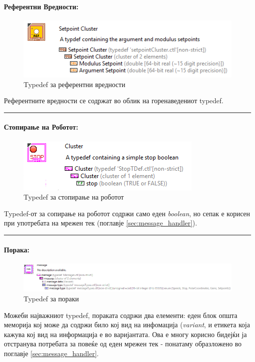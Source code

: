 \documentclass[11pt]{article}
\begin{document}
      \paragraph{Референтни Вредности:\\}
	      \begin{figure}[H]
	        \includegraphics[width=0.55\linewidth]{./images/typedef_setpoints_border.png}
		      \caption{Typedef за референтни вредности}
	        \label{fig:setpoints_typedef}
	        \raggedright
	        \end{figure}
	      Референтните вредности се содржат во облик на горенаведениот typedef.\\
        \textcolor[RGB]{150,150,150}{\rule{\linewidth}{1.6pt}}

      \paragraph{Стопирање на Роботот:\\}
	      \begin{figure}[H]
	        \includegraphics[width=0.55\linewidth]{./images/typedef_stop_border.png}
		      \caption{Typedef за стопирање на роботот}
	        \label{fig:setpoints_typedef}
	        \raggedright
	        \end{figure}
        Typedef-от за сопирање на роботот содржи само еден \textit{boolean}, но сепак е корисен при употребата на мрежен тек (поглавје \ref{sec:message_handler}).\\
        \textcolor[RGB]{150,150,150}{\rule{\linewidth}{1.6pt}}

      \paragraph{Порака:\\}
        \begin{figure}[H]
          \includegraphics[width=0.85\linewidth]{./images/typedef_message.png}
          \caption{Typedef за пораки}
          \label{fig:message_typedef}
          \raggedright
          \end{figure}
        Можеби најважниот typedef, пораката содржи два елементи: еден блок општа меморија кој може да содржи било кој вид на инфомација (\textit{variant}, и етикета која кажува кој вид на информација е во варијантата. Ова е многу корисно бидејќи ја отстранува потребата за повеќе од еден мрежен тек - понатаму образложено во поглавје \ref{sec:message_handler}.
\end{document}
